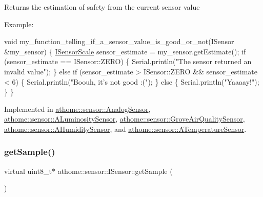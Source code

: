 Returns the estimation of safety from the current sensor value

Example\+:


\begin{DoxyCode}
\textcolor{keywordtype}{void} my\_function\_telling\_if\_a\_sensor\_value\_is\_good\_or\_not(ISensor &my\_sensor) \{
  \mbox{\hyperlink{classathome_1_1sensor_1_1_i_sensor_aa70bc27a4c17c86caf96cca776541ddf}{ISensorScale}} sensor\_estimate = my\_sensor.getEstimate();
  \textcolor{keywordflow}{if} (sensor\_estimate == ISensor::ZERO) \{
    Serial.println(\textcolor{stringliteral}{"The sensor returned an invalid value"});
  \}
  \textcolor{keywordflow}{else} \textcolor{keywordflow}{if} (sensor\_estimate > ISensor::ZERO && sensor\_estimate < 6) \{
    Serial.println(\textcolor{stringliteral}{"Boouh, it's not good :("});
  \}
  \textcolor{keywordflow}{else} \{
    Serial.println(\textcolor{stringliteral}{"Yaaaay!"});
  \}
\}
\end{DoxyCode}
 

Implemented in \mbox{\hyperlink{classathome_1_1sensor_1_1_analog_sensor_a728e2f65638f488cd1829c5f318531db}{athome\+::sensor\+::\+Analog\+Sensor}}, \mbox{\hyperlink{classathome_1_1sensor_1_1_a_luminosity_sensor_aa6c0e60c108b0494f0132b033ce3dd82}{athome\+::sensor\+::\+A\+Luminosity\+Sensor}}, \mbox{\hyperlink{classathome_1_1sensor_1_1_grove_air_quality_sensor_a3eeec77eb0bbf3932cdfa9d33a708e57}{athome\+::sensor\+::\+Grove\+Air\+Quality\+Sensor}}, \mbox{\hyperlink{classathome_1_1sensor_1_1_a_humidity_sensor_a1da82433989c79066ce32d5606f4f675}{athome\+::sensor\+::\+A\+Humidity\+Sensor}}, and \mbox{\hyperlink{classathome_1_1sensor_1_1_a_temperature_sensor_a3997ff080f6a9e444c52a63f1b40d73c}{athome\+::sensor\+::\+A\+Temperature\+Sensor}}.

\mbox{\label{classathome_1_1sensor_1_1_i_sensor_a2513fd8acc5d8251439330ca0e78cf04}} 
\subsubsection{\texorpdfstring{get\+Sample()}{getSample()}}
{\footnotesize\ttfamily virtual uint8\+\_\+t$\ast$ athome\+::sensor\+::\+I\+Sensor\+::get\+Sample (\begin{DoxyParamCaption}{ }\end{DoxyParamCaption})\hspace{0.3cm}{\ttfamily [pure virtual]}}

